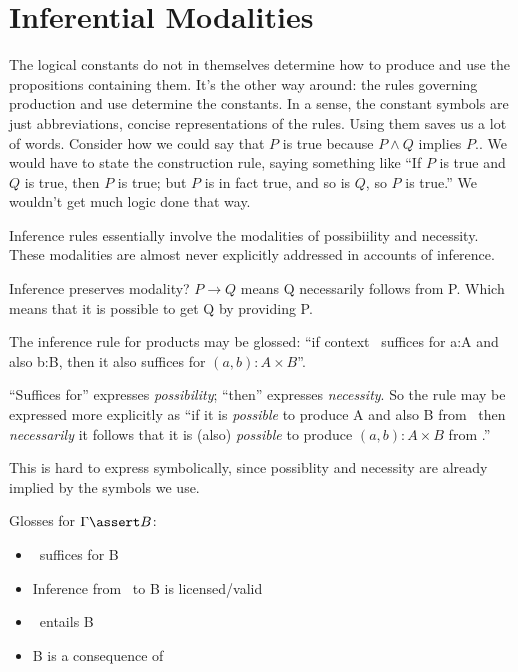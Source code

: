 \documentclass{article}
\begin{document}
\section{Inferential Modalities}

The logical constants do not in themselves determine how to produce
and use the propositions containing them. It's the other way around:
the rules governing production and use determine the constants. In a
sense, the constant symbols are just abbreviations, concise
representations of the rules. Using them saves us a lot of words.
Consider how we could say that \(P\) is true because \(P\land Q\)
implies \(P\).. We would have to state the construction rule, saying
something like ``If \(P\) is true and \(Q\) is true, then \(P\) is
true; but \(P\) is in fact true, and so is \(Q\), so \(P\) is true.''
We wouldn't get much logic done that way.

Inference rules essentially involve the modalities of possibiility and
necessity. These modalities are almost never explicitly addressed in
accounts of inference.

Inference preserves modality? \(P\rightarrow Q\) means Q necessarily
follows from P. Which means that it is possible to get Q by
providing P.

The inference rule for products may be glossed: ``if
context \ContextG\ suffices for a:A and also b:B, then it also suffices for \( (a,b):A\times B\)''.

``Suffices for'' expresses \textit{possibility}; ``then'' expresses
\textit{necessity}. So the rule may be expressed more explicitly as
``if it is \textit{possible} to produce A and also B from \Gamma\,
then \textit{necessarily} it follows that it is (also)
\textit{possible} to produce \( (a,b):A\times B \) from \Gamma.''

This is hard to express symbolically, since possiblity and necessity
are already implied by the symbols we use.

Glosses for \(\Gamma\linfer B\):

\begin{itemize}
\item \Gamma\ suffices for B
\item Inference from \Gamma\ to B is licensed/valid
\item \Gamma\ entails B
\item B is a consequence of \Gamma
\end{itemize}
\end{document}
